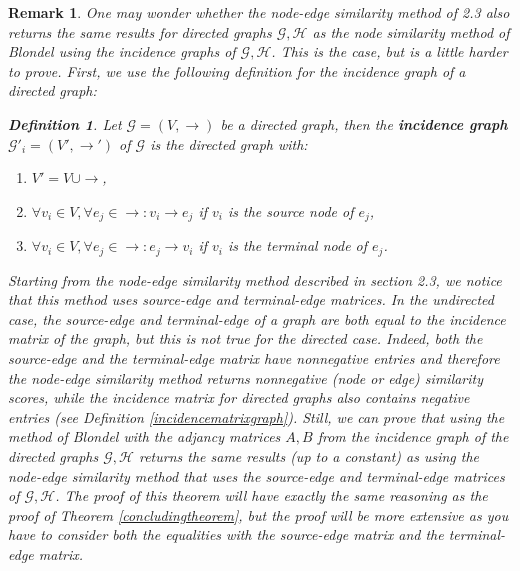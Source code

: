 \documentclass[a4paper,11pt]{report}
\newtheorem{definition}[theorem]{Definition}
\newtheorem{remark}[theorem]{Remark}
\newcommand{\graf}{\mathscr{G}}
\newcommand{\grafeen}{\mathscr{H}}
\begin{document}
 \begin{remark}
   One may wonder whether the node-edge similarity method of 2.3 also returns 
   the same results for directed graphs $\graf, \grafeen$ as the node similarity 
   method of Blondel using the incidence graphs of $\graf, \grafeen$. This is the case, but is a 
   little harder to prove. First, we use the following definition for the incidence graph of a directed graph:
    \begin{definition}
  Let $\graf = (V,\to)$ be a directed graph, then the \textbf{incidence graph} $\graf'_i =(V', \to')$ 
  of $\graf$ is the directed graph with:
   
  \begin{enumerate}
    \item $V' = V \cup \to$,
    \item $\forall v_i \in V, \forall e_j \in \to: v_i \to e_j$ if $v_i$ is the source node of $e_j$,
    \item $\forall v_i \in V, \forall e_j \in \to: e_j \to v_i$ if $v_i$ is the terminal node of $e_j$.
 \end{enumerate}

\end{definition}
  Starting from the node-edge similarity method described in section 2.3,
   we notice that this method uses source-edge and terminal-edge matrices. In 
   the undirected case, the source-edge and terminal-edge of a graph are both equal to the 
   incidence matrix of the graph, but this is not true for the directed case. Indeed, both 
   the source-edge and the terminal-edge matrix have nonnegative entries and therefore the node-edge similarity method returns nonnegative
   (node or edge) similarity scores, while the incidence matrix for directed graphs also contains negative entries (see Definition 
   \ref{incidencematrixgraph}).  Still, we can prove that using the method of 
   Blondel with the adjancy matrices $A, B$ from the incidence graph of the 
   directed graphs $\graf, \grafeen$ returns the same results (up to a constant) 
   as using the node-edge similarity method that uses the source-edge and 
   terminal-edge matrices of $\graf, \grafeen$. The proof of this theorem will 
   have exactly the same reasoning as the proof of Theorem 
   \ref{concludingtheorem}, but the proof will be more extensive as you have to 
   consider both the equalities with the source-edge matrix and the 
   terminal-edge matrix.


 \end{remark}
\end{document}
